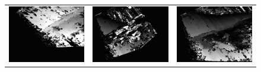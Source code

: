 \documentclass[11pt]{report}
\begin{document}
\begin{figure}[H]
\begin{tabular}{ccc}
    \includegraphics[scale=0.1]{images/disparity-opencv-t/disparity_12.png} &
    \includegraphics[scale=0.1]{images/disparity-opencv-d/disparity_12.png} &
    \includegraphics[scale=0.1]{images/disparity-opengv/disparity_12.png} \\

\end{tabular}
\end{figure}
\end{document}

